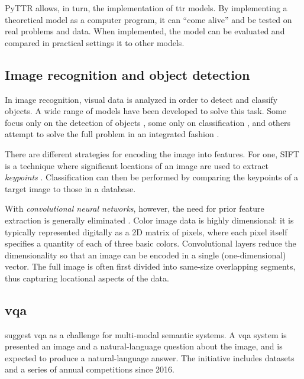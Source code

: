 PyTTR allows, in turn, the implementation of \gls{ttr} models.
By implementing a theoretical model as a computer program, it can ``come alive'' and be tested on real problems and data.
When implemented, the model can be evaluated and compared in practical settings it to other models.




\subsection{Image recognition and object detection}

In image recognition, visual data is analyzed in order to detect and classify objects.
A wide range of models have been developed to solve this task.
Some focus only on the detection of objects \citep{BlaschkoLearningLocalizeObjects2008}, some only on classification \citep[ResNet,][]{HeDeepResidualLearning2015}, and others attempt to solve the full problem in an integrated fashion \citep{RedmonYouOnlyLook2015,HeMaskRCNN2017}.

There are different strategies for encoding the image into features.
For one, SIFT is a technique where significant locations of an image are used to extract \textit{keypoints} \citep{LoweObjectrecognitionlocal1999}.
Classification can then be performed by comparing the keypoints of a target image to those in a database.

With \textit{convolutional neural networks}, however, the need for prior feature extraction is generally eliminated \citep{HeDeepResidualLearning2015, HeMaskRCNN2017}.
Color image data is highly dimensional: it is typically represented digitally as a 2D matrix of pixels, where each pixel itself specifies a quantity of each of three basic colors.
Convolutional layers reduce the dimensionality so that an image can be encoded in a single (one-dimensional) vector.
The full image is often first divided into same-size overlapping segments, thus capturing locational aspects of the data.



\subsection{\Acrfull{vqa}}

\cite{AgrawalVQAVisualQuestion2015} suggest \gls{vqa} as a challenge for multi-modal semantic systems.
A \gls{vqa} system is presented an image and a natural-language question about the image, and is expected to produce a natural-language answer.
The initiative includes datasets and a series of annual competitions since 2016.

